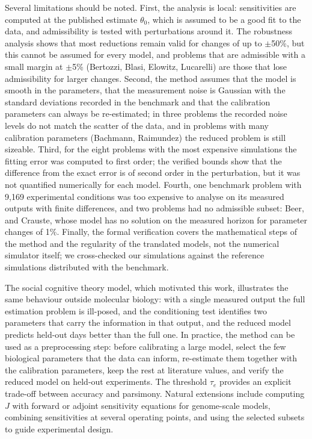 \documentclass[pdflatex,sn-nature]{sn-jnl}
\theoremstyle{plain}
\begin{document}
Several limitations should be noted. First, the analysis is local: sensitivities are computed at the published estimate $\theta_0$, which is assumed to be a good fit to the data, and admissibility is tested with perturbations around it. The robustness analysis shows that most reductions remain valid for changes of up to $\pm$50\%, but this cannot be assumed for every model, and problems that are admissible with a small margin at $\pm$5\% (Bertozzi, Blasi, Elowitz, Lucarelli) are those that lose admissibility for larger changes. Second, the method assumes that the model is smooth in the parameters, that the measurement noise is Gaussian with the standard deviations recorded in the benchmark and that the calibration parameters can always be re-estimated; in three problems the recorded noise levels do not match the scatter of the data, and in problems with many calibration parameters (Bachmann, Raimundez) the reduced problem is still sizeable. Third, for the eight problems with the most expensive simulations the fitting error was computed to first order; the verified bounds show that the difference from the exact error is of second order in the perturbation, but it was not quantified numerically for each model. Fourth, one benchmark problem with 9,169 experimental conditions was too expensive to analyse on its measured outputs with finite differences, and two problems had no admissible subset: Beer, and Crauste, whose model has no solution on the measured horizon for parameter changes of 1\%. Finally, the formal verification covers the mathematical steps of the method and the regularity of the translated models, not the numerical simulator itself; we cross-checked our simulations against the reference simulations distributed with the benchmark.

The social cognitive theory model, which motivated this work, illustrates the same behaviour outside molecular biology: with a single measured output the full estimation problem is ill-posed, and the conditioning test identifies two parameters that carry the information in that output, and the reduced model predicts held-out days better than the full one. In practice, the method can be used as a preprocessing step: before calibrating a large model, select the few biological parameters that the data can inform, re-estimate them together with the calibration parameters, keep the rest at literature values, and verify the reduced model on held-out experiments. The threshold $\tau_e$ provides an explicit trade-off between accuracy and parsimony. Natural extensions include computing $J$ with forward or adjoint sensitivity equations for genome-scale models, combining sensitivities at several operating points, and using the selected subsets to guide experimental design\cite{bib28}.
\end{document}
